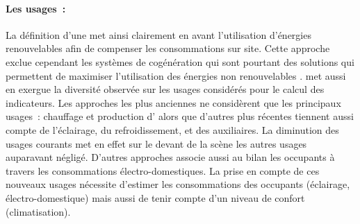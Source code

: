 \paragraph{Les usages~:} %
\label{par:les_usages}
La définition d’une  met ainsi clairement en avant l’utilisation d’énergies
renouvelables afin de compenser les consommations sur site. Cette approche exclue
cependant les systèmes de cogénération qui sont pourtant des solutions qui permettent
de maximiser l’utilisation des énergies non renouvelables \parencite{Sartori2010}.
\textcite{Marszal2011971} met aussi en exergue la diversité observée sur les usages considérés pour le calcul
des indicateurs. Les approches les plus anciennes ne considèrent que les principaux usages~: chauffage
et production d’ alors que d’autres plus récentes tiennent aussi compte de l’éclairage,
du refroidissement, et des auxiliaires. La diminution des usages courants met en effet
sur le devant de la scène les autres usages auparavant négligé. D’autres approches
associe aussi au bilan les occupants à travers les consommations électro-domestiques.
La prise en compte de ces nouveaux usages nécessite d’estimer les consommations des occupants
(éclairage, électro-domestique) mais aussi de tenir compte d’un niveau de confort (climatisation).


